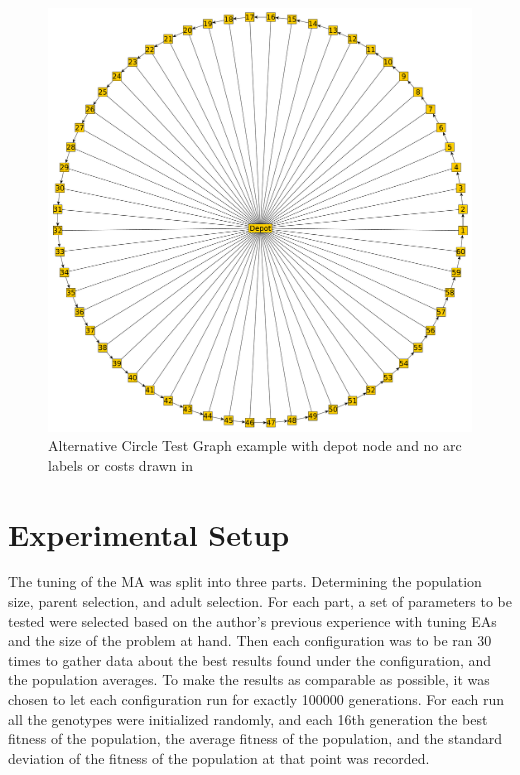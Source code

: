 \begin{figure}[thbp]
	\centerline{\includegraphics[width=\textwidth]{figures/CircleTests/CircleTestIllustrations/Circle_Test_Graph_Central_Depot-No_arc_or_edge_labels_or_costs.pdf}}
	\caption{Alternative Circle Test Graph example with depot node and no arc labels or costs drawn in}
	\label{fig:ctgcdnaoeloc}
\end{figure}



\section{Experimental Setup} %
\label{sec:experimental_setup}
The tuning of the MA was split into three parts. Determining the population size, parent selection, and adult selection. 
For each part, a set of parameters to be tested were selected based on the author's previous experience with tuning EAs and the size of the problem at hand. Then each configuration was to be ran 30 times to gather data about the best results found under the configuration, and the population averages. To make the results as comparable as possible, it was chosen to let each configuration run for exactly 100000 generations. For each run all the genotypes were initialized randomly, and each 16th generation the best fitness of the population, the average fitness of the population, and the standard deviation of the fitness of the population at that point was recorded.

